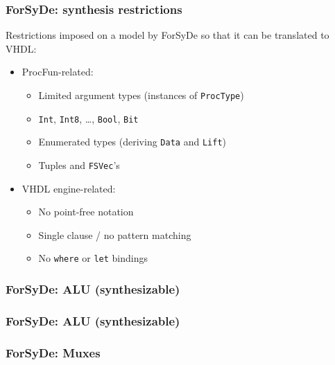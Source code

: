 \documentclass{beamer}
\begin{document}
            \begin{frame}
                \frametitle{ForSyDe: synthesis restrictions}
                \par{Restrictions imposed on a model by ForSyDe so that it can be translated to VHDL:}
                \begin{itemize}
                    \item ProcFun-related:
                        \begin{itemize}
                            \item Limited argument types (instances of \texttt{ProcType})
                            \item \texttt{Int}, \texttt{Int8}, \ldots, \texttt{Bool}, \texttt{Bit}
                            \item Enumerated types (deriving \texttt{Data} and \texttt{Lift})
                            \item Tuples and \texttt{FSVec}'s
                        \end{itemize}
                    \item VHDL engine-related:
                        \begin{itemize}
                            \item No point-free notation
                            \item Single clause / no pattern matching
                            \item No \texttt{where} or \texttt{let} bindings
                        \end{itemize}
                \end{itemize}
            \end{frame}

            \begin{frame}
                \frametitle{ForSyDe: ALU (synthesizable)}
            \end{frame}

            \begin{frame}
                \frametitle{ForSyDe: ALU (synthesizable)}
            \end{frame}


            \begin{frame}
                \frametitle{ForSyDe: Muxes}
            \end{frame}
\end{document}
